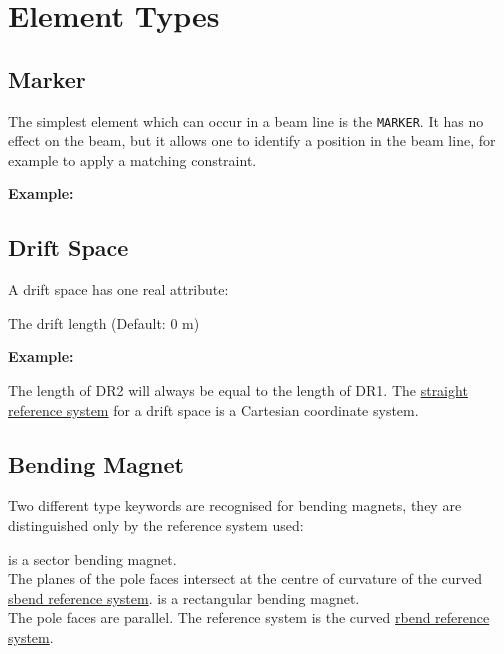 
\chapter{Element Types}

\section{Marker}
\label{sec:marker}

The simplest element which can occur in a beam line is the {\tt MARKER}. It
has no effect on the beam, but it allows one to identify a position in
the beam line, for example to apply a matching constraint.  

{\bf Example:}


\section{Drift Space}
\label{sec:drift}


A drift space has one real attribute: 
\begin{madlist}
    The drift length (Default: 0 m) 
\end{madlist}

{\bf Example: }

The length of DR2 will always be equal to the length of DR1. The
\hyperref[subsec:local_straight]{straight reference system} for a drift
space is a Cartesian coordinate system.   


\section{Bending Magnet}
\label{sec:bend}
Two different type keywords are recognised for bending magnets, they are
distinguished only by the reference system used:  
\begin{madlist}
  \label{bend_sbend} is a sector bending magnet. \\
  The planes of the pole faces intersect at the centre of curvature of
  the curved 
  \hyperref[subsec:local_rbend]{sbend reference system}.  
  \label{bend_rbend} is a rectangular bending magnet. \\ 
  The pole faces are parallel. The reference system is the curved  
  \hyperref[subsec:local_rbend]{rbend reference system}.
\end{madlist}

